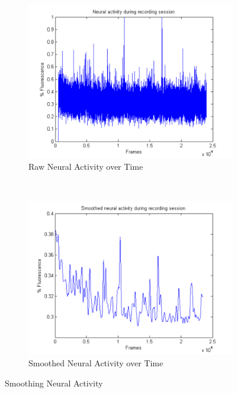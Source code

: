 \documentclass{article}
\begin{document}
\begin{figure}[ht]
  \centering
  
  \begin{subfigure}{0.45\textwidth}
    \includegraphics[width=\textwidth]{neural_activity}
    \caption{Raw Neural Activity over Time}
    \label{fig:neural_activity}
  \end{subfigure}
  ~
  \begin{subfigure}{0.45\textwidth}
    \includegraphics[width=\textwidth]{smooth_neural_activity}
    \caption{Smoothed Neural Activity over Time}
    \label{fig:smoothed_neural_activity}
  \end{subfigure}

  \caption{Smoothing Neural Activity}
  \label{fig:smoothing}
\end{figure}
\end{document}
